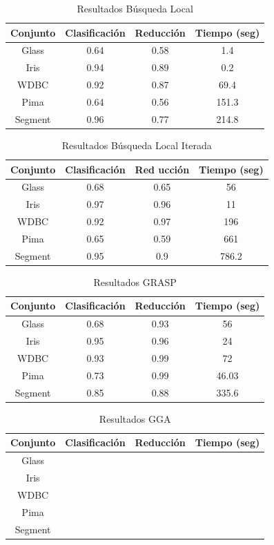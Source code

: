 \documentclass{ci5652}
\begin{document}
\begin{table}[!h]
	\centering
	\begin{tabular}{c c c c}
	\hline
	Conjunto & Clasificación & Reducción & Tiempo (seg) \\
	\hline
	Glass & 0.64 & 0.58 & 1.4 \\
	Iris & 0.94 & 0.89 & 0.2 \\
	WDBC & 0.92 & 0.87 & 69.4 \\
	Pima & 0.64 & 0.56 & 151.3 \\
	Segment & 0.96 & 0.77 & 214.8 \\
	\end{tabular}
	\caption{Resultados Búsqueda Local}
	\label{table:ls-result}
\end{table}


\begin{table}[!h]
	\centering
	\begin{tabular}{c c c c}
	\hline
	Conjunto & Clasificación & Red	ucción & Tiempo (seg) \\
	\hline
	Glass & 0.68 & 0.65 & 56 \\
	Iris & 0.97 & 0.96 & 11 \\
	WDBC & 0.92 & 0.97 & 196 \\
	Pima & 0.65 & 0.59 & 661 \\
	Segment & 0.95 & 0.9 & 786.2 \\
	\end{tabular}
	\caption{Resultados Búsqueda Local Iterada}
	\label{table:ils-result}
\end{table}


\begin{table}[!h]
	\centering
	\begin{tabular}{c c c c}
	\hline
	Conjunto & Clasificación & Reducción & Tiempo (seg) \\
	\hline
	Glass & 0.68 & 0.93 & 56 \\
	Iris & 0.95 & 0.96 & 24 \\
	WDBC & 0.93 & 0.99 & 72 \\
	Pima & 0.73 & 0.99 & 46.03 \\
	Segment & 0.85 & 0.88 & 335.6 \\
	\end{tabular}
	\caption{Resultados GRASP}
	\label{table:grasp-result}
\end{table}


\begin{table}[!h]
	\centering
	\begin{tabular}{c c c c}
	\hline
	Conjunto & Clasificación & Reducción & Tiempo (seg) \\
	\hline
	Glass & & & \\
	Iris & & & \\
	WDBC & & & \\
	Pima & & & \\
	Segment & & & \\
	\end{tabular}
	\caption{Resultados GGA}
	\label{table:gga-result}
\end{table}
\end{document}
